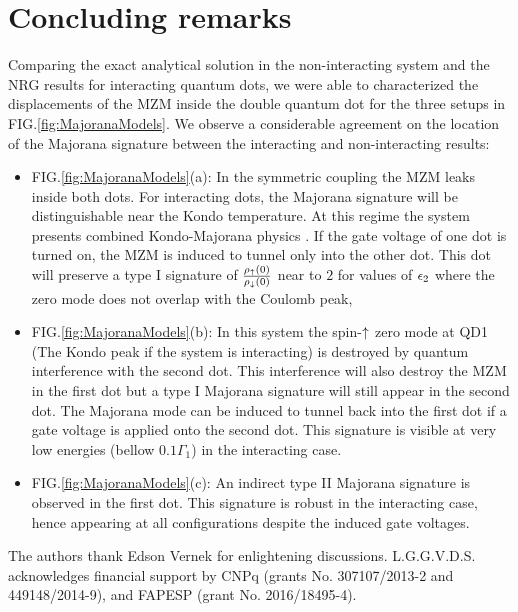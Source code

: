 \documentclass[showpacs,aps,prb,reprint,superscriptaddress]{revtex4-1}
\begin{document}
\section{Concluding remarks}
\label{sec:Conclusions}
Comparing the exact analytical solution in the non-interacting system and the NRG results for interacting quantum dots, we were able to characterized the displacements of the MZM inside the double quantum dot for the three setups in FIG.\ref{fig:MajoranaModels}. We observe a considerable agreement on the location of the Majorana signature between the interacting and non-interacting results:

\begin{itemize}
	\item[]FIG.\ref{fig:MajoranaModels}(a): In the symmetric coupling the MZM leaks inside both dots. For interacting dots, the Majorana signature will be distinguishable near the Kondo temperature. At this regime the system presents combined Kondo-Majorana physics . If the gate voltage of one dot is turned on, the MZM is induced to tunnel only into the other dot. This dot will preserve a  type I signature of $\frac{\rho_\uparrow(0)}{\rho_\downarrow(0)}$ near to $2$ for values of $\epsilon_2$ where the zero mode does not overlap with the Coulomb peak,
	\item[]FIG.\ref{fig:MajoranaModels}(b): In this system the spin-$\uparrow$ zero mode at QD1 (The Kondo peak if the system is interacting) is destroyed by quantum interference with the second dot. This interference will also destroy the MZM in the first dot but a type I Majorana signature will still appear in the second dot. The Majorana mode can be induced to tunnel back into the first dot if a gate voltage is applied onto the second dot. This signature is visible at very low energies (bellow $0.1\Gamma_1$) in the interacting case. 
	\item[]FIG.\ref{fig:MajoranaModels}(c): An  indirect type II Majorana signature is observed in the first dot. This signature is robust in the interacting case, hence appearing at all configurations despite the induced gate voltages.  

\end{itemize}


\begin{acknowledgments}
The authors thank Edson Vernek for enlightening discussions.  L.G.G.V.D.S. acknowledges financial support by CNPq (grants No. 307107/2013-2 and 449148/2014-9), and FAPESP (grant No. 2016/18495-4).
\end{acknowledgments}
\end{document}
